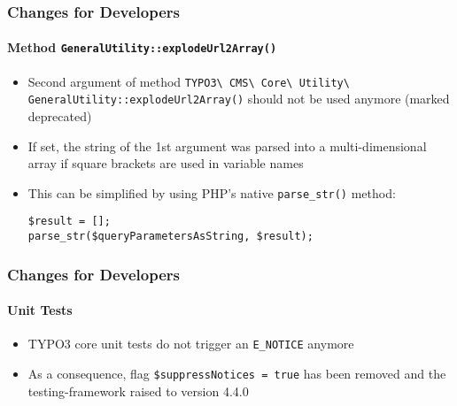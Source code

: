 \begin{frame}[fragile]
	\frametitle{Changes for Developers}
	\framesubtitle{Method \texttt{GeneralUtility::explodeUrl2Array()}}

	\begin{itemize}
		\item Second argument of method
			\smaller
				\texttt{TYPO3\textbackslash
					CMS\textbackslash
					Core\textbackslash
					Utility\textbackslash
					GeneralUtility::explodeUrl2Array()}\newline
			\normalsize
			should not be used anymore (marked deprecated)

		\item If set, the string of the 1st argument was parsed into a
			multi-dimensional array if square brackets are used in variable names
		\item This can be simplified by using PHP's native \texttt{parse\_str()}
			method:

			\begin{lstlisting}
$result = [];
parse_str($queryParametersAsString, $result);
			\end{lstlisting}

	\end{itemize}

\end{frame}


\begin{frame}[fragile]
	\frametitle{Changes for Developers}
	\framesubtitle{Unit Tests}

	\begin{itemize}
		\item TYPO3 core unit tests do not trigger an \texttt{E\_NOTICE} anymore
		\item As a consequence, flag \texttt{\$suppressNotices = true} has been
			removed and the testing-framework raised to version 4.4.0

	\end{itemize}

\end{frame}

